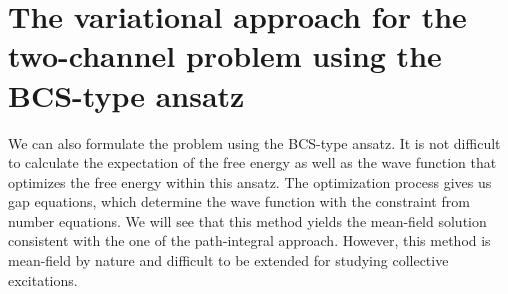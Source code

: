 \chapter{The variational approach for the two-channel problem using  the BCS-type ansatz\label{ch:mean}}
We can also formulate the problem  using the  BCS-type ansatz.  It is not difficult to calculate  the expectation of the free energy as well as  the wave function that optimizes the free energy within this ansatz.  The optimization process gives us gap equations, which determine the  wave function with the constraint from number equations.   %
We will see that this method yields  the mean-field solution consistent with the one of the path-integral approach.  However, this method is mean-field by nature and  difficult  to be extended for studying collective excitations.  

